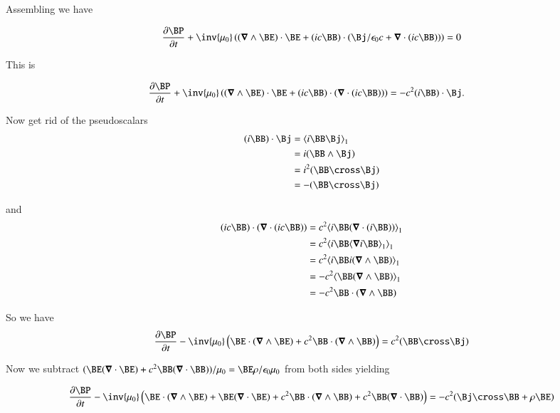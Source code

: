 \documentclass{article}
\begin{document}
Assembling we have

\begin{align*}
\PD{t}{\BP} + \inv{\mu_0} \left( (\spacegrad \wedge \BE) \cdot \BE + (i c\BB) \cdot ( \Bj/\epsilon_0 c + \spacegrad \cdot (ic \BB) ) \right) &= 0 \\
\end{align*}

This is

\begin{align*}
\PD{t}{\BP} + \inv{\mu_0} \left( (\spacegrad \wedge \BE) \cdot \BE + (i c\BB) \cdot ( \spacegrad \cdot (ic \BB) ) \right) &= -c^2 (i \BB) \cdot \Bj.
\end{align*}

Now get rid of the pseudoscalars
\begin{align*}
(i \BB) \cdot \Bj
&= \gpgradeone{ i \BB \Bj } \\
&= i (\BB \wedge \Bj) \\
&= i^2 (\BB \cross \Bj) \\
&= -(\BB \cross \Bj) \\
\end{align*}

and 
\begin{align*}
(i c\BB) \cdot ( \spacegrad \cdot (ic \BB) )  
&= c^2 \gpgradeone{ i \BB ( \spacegrad \cdot (i\BB) ) } \\
&= c^2 \gpgradeone{ i \BB \gpgradeone{\spacegrad i\BB} } \\
&= c^2 \gpgradeone{ i \BB i (\spacegrad \wedge \BB) } \\
&= -c^2 \gpgradeone{ \BB (\spacegrad \wedge \BB) } \\
&= -c^2 \BB \cdot (\spacegrad \wedge \BB) \\
\end{align*}

So we have
\begin{align*}
\PD{t}{\BP} - \inv{\mu_0} \left( \BE \cdot (\spacegrad \wedge \BE) +c^2 \BB \cdot (\spacegrad \wedge \BB) \right) &= c^2 (\BB \cross \Bj) \\
\end{align*}

Now we subtract $(\BE (\spacegrad \cdot \BE) + c^2 \BB (\spacegrad \cdot \BB))/\mu_0 = \BE \rho/\epsilon_0\mu_0$ from both sides yielding

\begin{align*}
\PD{t}{\BP} - \inv{\mu_0} \left( 
\BE \cdot (\spacegrad \wedge \BE) + \BE (\spacegrad \cdot \BE) 
+ c^2 \BB \cdot (\spacegrad \wedge \BB) 
+ c^2 \BB (\spacegrad \cdot \BB)
\right) &= -c^2 (\Bj \cross \BB + \rho \BE) \\
\end{align*}
\end{document}
